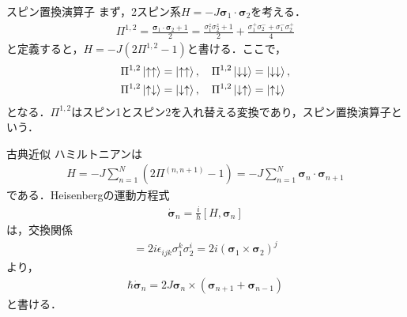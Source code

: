 \documentclass[dvipdfmx,9pt]{beamer}
\numberwithin{equation}{section}
\begin{document}
\begin{frame}{スピン置換演算子}
    まず，2スピン系$H = -J\bm{\sigma}_1 \cdot \bm{\sigma}_2$を考える．
    \begin{align}
        \Pi^{1,2} = \frac{\bm{\sigma}_1\cdot \bm{\sigma}_2 + 1}{2}
        = \frac{\sigma_1^z\sigma_2^z + 1}{2}
        + \frac{\sigma_1^+\sigma_2^- + \sigma_1^-\sigma_2^+}{4}
    \end{align}
    と定義すると，$H = -J(2\Pi^{1,2}-1)$と書ける．ここで，
    \begin{align*}
        &
        \Pi^{1,2} \ket{\uparrow\uparrow} = \ket{\uparrow\uparrow},
        \quad
        \Pi^{1,2} \ket{\downarrow\downarrow} = \ket{\downarrow\downarrow},
        \\ &
        \Pi^{1,2} \ket{\uparrow\downarrow} = \ket{\downarrow\uparrow},
        \quad
        \Pi^{1,2} \ket{\downarrow\uparrow} = \ket{\uparrow \downarrow}
    \end{align*}
    となる．$\Pi^{1,2}$はスピン1とスピン2を入れ替える変換であり，スピン置換演算子という．
\end{frame}

\begin{frame}{古典近似}
    ハミルトニアンは
    \begin{align}
        H = -J \sum_{n=1}^N (2\Pi^{(n,n+1)} - 1) = -J \sum_{n=1}^N \bm{\sigma}_n\cdot \bm{\sigma}_{n+1}
    \end{align}
    である．Heisenbergの運動方程式
    \begin{align}
        \dot{\bm{\sigma}}_n = \frac{i}{\hbar}[H, \bm{\sigma}_n]
    \end{align}
    は，交換関係
    \begin{align}
        [\sigma_1^i\sigma_2^i, \sigma_1^j] = 2i\epsilon_{ijk}\sigma_1^k \sigma_2^i = 2i(\bm{\sigma}_1 \times \bm{\sigma}_2)^j
    \end{align}
    より，
    \begin{align}
        \hbar \dot{\bm{\sigma}}_n = 2J \bm{\sigma}_n \times (\bm{\sigma}_{n+1} + \bm{\sigma}_{n-1})
    \end{align}
    と書ける．
\end{frame}
\end{document}
